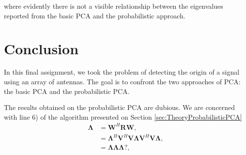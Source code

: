 \documentclass[letterpaper, 10 pt, conference]{ieeeconf}  %
\begin{document}
where evidently there is not a visible relationship between the eigenvalues reported from the basic PCA and the probabilistic approach. 

\section{Conclusion}
\label{sec:Conclusion}

In this final assignment, we took the problem of detecting the origin of a signal using an array of antennas. The goal is to confront the two approaches of PCA: the basic PCA and
the probabilistic PCA.

The results obtained on the  probabilistic PCA are dubious. We are concerned with line 6) of the algorithm presented on Section \ref{sec:TheoryProbabilisticPCA}
\begin{equation*}
\begin{aligned}
\bm{\Lambda} & = \bm{W}^{H} \bm{R} \bm{W},\\
              & = \bm{\Lambda}^{H} \bm{V}^{H} \bm{V} \bm{\Lambda} \bm{V}^{H} \bm{V} \bm{\Lambda},\\
              & = \bm{\Lambda} \bm{\Lambda} \bm{\Lambda}?,\\
\end{aligned}
\end{equation*}
 









\end{document}
